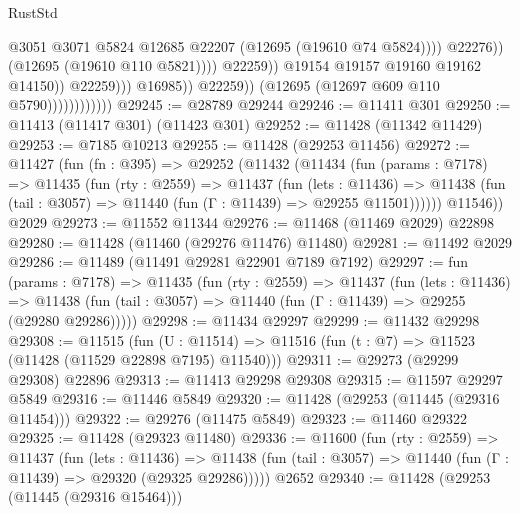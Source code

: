 \begin{lexlean}{RustStd}
\begin{coremodule}
                                                          @3051
                                                          @3071
                                                          @5824
                                                          @12685
                                                          @22207
                                                          (@12695 (@19610 @74 @5824))))
                                                      @22276))
                                                  (@12695 (@19610 @110 @5821))))
                                              @22259))
                                          @19154
                                          @19157
                                          @19160
                                          @19162
                                          @14150))
                                      @22259)))
                                @16985))
                            @22259))
                        (@12695 (@12697 @609 @110 @5790))))))))))))
@29245 := @28789 @29244
@29246 := @11411 @301
@29250 := @11413 (@11417 @301) (@11423 @301)
@29252 := @11428 (@11342 @11429)
@29253 := @7185 @10213
@29255 := @11428 (@29253 @11456)
@29272 := @11427
    (fun (fn : @395) =>
    @29252
      (@11432
        (@11434
          (fun (params : @7178) =>
          @11435
            (fun (rty : @2559) =>
            @11437
              (fun (lets : @11436) =>
              @11438 (fun (tail : @3057) => @11440 (fun (Γ : @11439) => @29255 @11501))))))
        @11546))
    @2029
@29273 := @11552 @11344
@29276 := @11468 (@11469 @2029) @22898
@29280 := @11428 (@11460 (@29276 @11476) @11480)
@29281 := @11492 @2029
@29286 := @11489 (@11491 @29281 @22901 @7189 @7192)
@29297 := fun (params : @7178) =>
  @11435
    (fun (rty : @2559) =>
    @11437
      (fun (lets : @11436) =>
      @11438 (fun (tail : @3057) => @11440 (fun (Γ : @11439) => @29255 (@29280 @29286)))))
@29298 := @11434 @29297
@29299 := @11432 @29298
@29308 := @11515
    (fun (U : @11514) => @11516 (fun (t : @7) => @11523 (@11428 (@11529 @22898 @7195) @11540)))
@29311 := @29273 (@29299 @29308) @22896
@29313 := @11413 @29298 @29308
@29315 := @11597 @29297 @5849
@29316 := @11446 @5849
@29320 := @11428 (@29253 (@11445 (@29316 @11454)))
@29322 := @29276 (@11475 @5849)
@29323 := @11460 @29322
@29325 := @11428 (@29323 @11480)
@29336 := @11600
    (fun (rty : @2559) =>
    @11437
      (fun (lets : @11436) =>
      @11438 (fun (tail : @3057) => @11440 (fun (Γ : @11439) => @29320 (@29325 @29286)))))
    @2652
@29340 := @11428 (@29253 (@11445 (@29316 @15464)))

\end{coremodule}
\end{lexlean}

